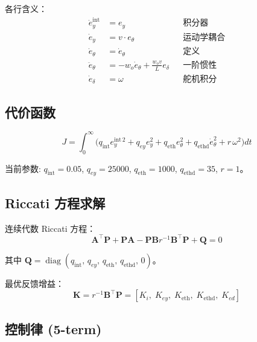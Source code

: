 \documentclass[11pt,a4paper]{article}
\begin{document}
各行含义：
\begin{align}
\dot{e}_y^{\text{int}} &= e_y                            &&\text{积分器} \\
\dot{e}_y              &= v \cdot e_\theta                &&\text{运动学耦合} \\
\dot{e}_\theta         &= \dot{e}_\theta                  &&\text{定义} \\
\ddot{e}_\theta        &= -w_o \dot{e}_\theta + \frac{w_o v}{L} e_\delta &&\text{一阶惯性} \\
\dot{e}_\delta         &= \omega                          &&\text{舵机积分}
\end{align}

\subsection{代价函数}

\begin{equation}
J = \int_0^\infty \big(
q_{\text{int}} e_y^{\text{int}\,2}
+ q_{ey} e_y^2
+ q_{\text{eth}} e_\theta^2
+ q_{\text{ethd}} \dot{e}_\theta^2
+ r\,\omega^2
\big) dt
\label{eq:cost}
\end{equation}

当前参数: $q_{\text{int}} = 0.05$, $q_{ey} = 25000$, $q_{\text{eth}} = 1000$, $q_{\text{ethd}} = 35$, $r = 1$。

\subsection{Riccati 方程求解}

连续代数 Riccati 方程：
\begin{equation}
\mathbf{A}^\top \mathbf{P} + \mathbf{P}\mathbf{A} - \mathbf{P}\mathbf{B}r^{-1}\mathbf{B}^\top\mathbf{P} + \mathbf{Q} = 0
\end{equation}

其中 $\mathbf{Q} = \operatorname{diag}(q_{\text{int}},\, q_{ey},\, q_{\text{eth}},\, q_{\text{ethd}},\, 0)$。

最优反馈增益：
\begin{equation}
\mathbf{K} = r^{-1}\mathbf{B}^\top\mathbf{P} = [K_i,\; K_{ey},\; K_{\text{eth}},\; K_{\text{ethd}},\; K_{ed}]
\end{equation}

\subsection{控制律 (5-term)}
\end{document}
